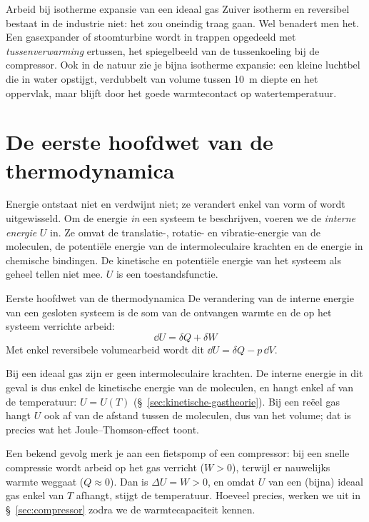 \begin{voorbeeld}{Arbeid bij isotherme expansie van een ideaal gas}
Zuiver isotherm en reversibel bestaat in de industrie niet: het zou oneindig traag gaan. Wel benadert men het. Een gasexpander of stoomturbine wordt in trappen opgedeeld met \emph{tussenverwarming} ertussen, het spiegelbeeld van de tussenkoeling bij de compressor. Ook in de natuur zie je bijna isotherme expansie: een kleine luchtbel die in water opstijgt, verdubbelt van volume tussen \SI{10}{\metre} diepte en het oppervlak, maar blijft door het goede warmtecontact op watertemperatuur.
\end{voorbeeld}

\section{De eerste hoofdwet van de thermodynamica}

Energie ontstaat niet en verdwijnt niet; ze verandert enkel van vorm of wordt uitgewisseld. Om de energie \emph{in} een systeem te beschrijven, voeren we de \emph{interne energie} $U$ in. Ze omvat de translatie-, rotatie- en vibratie-energie van de moleculen, de potenti\"ele energie van de intermoleculaire krachten en de energie in chemische bindingen. De kinetische en potenti\"ele energie van het systeem als geheel tellen niet mee. $U$ is een toestandsfunctie.

\begin{definitie}{Eerste hoofdwet van de thermodynamica}
De verandering van de interne energie van een gesloten systeem is de som van de ontvangen warmte en de op het systeem verrichte arbeid:
\begin{equation}
\boxed{\dd U = \delta Q + \delta W}
\end{equation}
Met enkel reversibele volumearbeid wordt dit $\dd U = \delta Q - p\,\dd V$.
\end{definitie}

Bij een ideaal gas zijn er geen intermoleculaire krachten. De interne energie in dit geval is dus enkel de kinetische energie van de moleculen, en hangt enkel af van de temperatuur: $U = U(T)$ (\S~\ref{sec:kinetische-gastheorie}). Bij een re\"eel gas hangt $U$ ook af van de afstand tussen de moleculen, dus van het volume; dat is precies wat het Joule--Thomson-effect toont.

Een bekend gevolg merk je aan een fietspomp of een compressor: bij een snelle compressie wordt arbeid op het gas verricht ($W > 0$), terwijl er nauwelijks warmte weggaat ($Q \approx 0$). Dan is $\Delta U = W > 0$, en omdat $U$ van een (bijna) ideaal gas enkel van $T$ afhangt, stijgt de temperatuur. Hoeveel precies, werken we uit in \S~\ref{sec:compressor} zodra we de warmtecapaciteit kennen.


